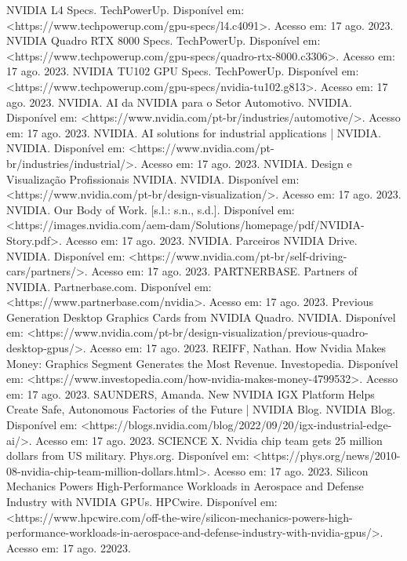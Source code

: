 \documentclass[conference]{IEEEtran}
\begin{document}
\begin{thebibliography}{00}
 NVIDIA L4 Specs. TechPowerUp. Disponível em: <https://www.techpowerup.com/gpu-specs/l4.c4091>. Acesso em: 17 ago. 2023.
 NVIDIA Quadro RTX 8000 Specs. TechPowerUp. Disponível em: <https://www.techpowerup.com/gpu-specs/quadro-rtx-8000.c3306>. Acesso em: 17 ago. 2023.
 NVIDIA TU102 GPU Specs. TechPowerUp. Disponível em: <https://www.techpowerup.com/gpu-specs/nvidia-tu102.g813>. Acesso em: 17 ago. 2023.
 NVIDIA. AI da NVIDIA para o Setor Automotivo. NVIDIA. Disponível em: <https://www.nvidia.com/pt-br/industries/automotive/>. Acesso em: 17 ago. 2023.
 NVIDIA. AI solutions for industrial applications | NVIDIA. NVIDIA. Disponível em: <https://www.nvidia.com/pt-br/industries/industrial/>. Acesso em: 17 ago. 2023.
 NVIDIA. Design e Visualização Profissionais NVIDIA. NVIDIA. Disponível em: <https://www.nvidia.com/pt-br/design-visualization/>. Acesso em: 17 ago. 2023.
 NVIDIA. Our Body of Work. [s.l.: s.n., s.d.]. Disponível em: <https://images.nvidia.com/aem-dam/Solutions/homepage/pdf/NVIDIA-Story.pdf>. Acesso em: 17 ago. 2023.
 NVIDIA. Parceiros NVIDIA Drive. NVIDIA. Disponível em: <https://www.nvidia.com/pt-br/self-driving-cars/partners/>. Acesso em: 17 ago. 2023.
 PARTNERBASE. Partners of NVIDIA. Partnerbase.com. Disponível em: <https://www.partnerbase.com/nvidia>. Acesso em: 17 ago. 2023.
 Previous Generation Desktop Graphics Cards from NVIDIA Quadro. NVIDIA. Disponível em: <https://www.nvidia.com/pt-br/design-visualization/previous-quadro-desktop-gpus/>. Acesso em: 17 ago. 2023.
 REIFF, Nathan. How Nvidia Makes Money: Graphics Segment Generates the Most Revenue. Investopedia. Disponível em: <https://www.investopedia.com/how-nvidia-makes-money-4799532>. Acesso em: 17 ago. 2023.
 SAUNDERS, Amanda. New NVIDIA IGX Platform Helps Create Safe, Autonomous Factories of the Future | NVIDIA Blog. NVIDIA Blog. Disponível em: <https://blogs.nvidia.com/blog/2022/09/20/igx-industrial-edge-ai/>. Acesso em: 17 ago. 2023.
 SCIENCE X. Nvidia chip team gets 25 million dollars from US military. Phys.org. Disponível em: <https://phys.org/news/2010-08-nvidia-chip-team-million-dollars.html>. Acesso em: 17 ago. 2023.
 ‌Silicon Mechanics Powers High-Performance Workloads in Aerospace and Defense Industry with NVIDIA GPUs. HPCwire. Disponível em: <https://www.hpcwire.com/off-the-wire/silicon-mechanics-powers-high-performance-workloads-in-aerospace-and-defense-industry-with-nvidia-gpus/>. Acesso em: 17 ago. 22023.

\end{thebibliography}
\end{document}
